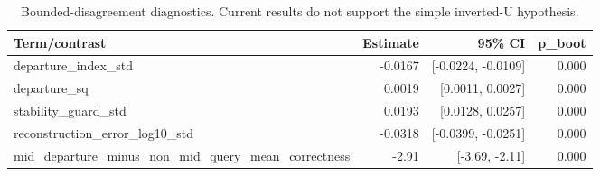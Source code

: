 \begin{table}[t]
\centering
\begin{tabular}{lrrr}
\toprule
Term/contrast & Estimate & 95\% CI & p\_boot \\
\midrule
departure\_index\_std & -0.0167 & [-0.0224, -0.0109] & 0.000 \\
departure\_sq & 0.0019 & [0.0011, 0.0027] & 0.000 \\
stability\_guard\_std & 0.0193 & [0.0128, 0.0257] & 0.000 \\
reconstruction\_error\_log10\_std & -0.0318 & [-0.0399, -0.0251] & 0.000 \\
mid\_departure\_minus\_non\_mid\_query\_mean\_correctness & -2.91 & [-3.69, -2.11] & 0.000 \\
\bottomrule
\end{tabular}
\caption{Bounded-disagreement diagnostics. Current results do not support the simple inverted-U hypothesis.}
\label{tab:ngc\_bounded\_disagreement}
\end{table}
